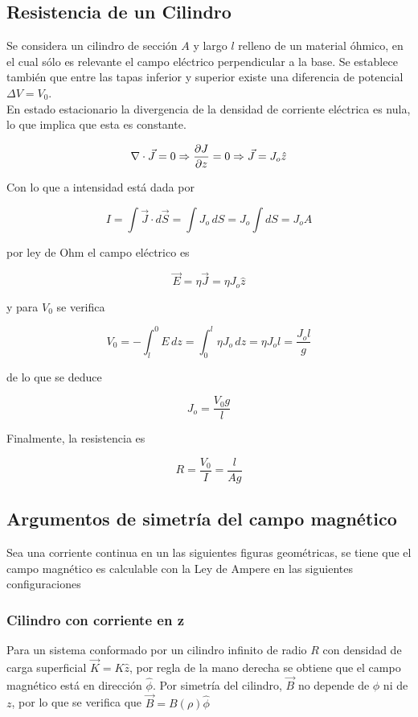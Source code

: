 \subsection{Resistencia de un Cilindro}
\label{ru:resist_cilindro}

Se considera un cilindro de sección $A$ y largo $l$ relleno de un material óhmico, en el cual sólo es relevante el campo eléctrico perpendicular a la base. Se establece también que entre las tapas inferior y superior existe una diferencia de potencial $\Delta V = V_0$.\\

En estado estacionario la divergencia de la densidad de corriente eléctrica es nula, lo que implica que esta es constante.

\[\nabla\cdot\Vec{J}=0\Rightarrow \frac{\partial J}{\partial z}=0\Rightarrow\Vec{J}=J_o\hat{z}\]

Con lo que a intensidad está dada por

\[I = \int\Vec{J}\cdot d\Vec{S}=\int J_o\,dS=J_o\int dS=J_oA\]

por ley de Ohm el campo eléctrico es

\[\Vec{E} = \eta\Vec{J} = \eta J_o\hat{z}\]

y para $V_0$ se verifica

\[V_0 = -\int^0_lE\,dz=\int^l_0\eta J_o\,dz=\eta J_ol=\frac{J_ol}{g}\]

de lo que se deduce

\[J_o = \frac{V_0g}{l}\]

Finalmente, la resistencia es

\[R = \frac{V_0}{I} = \frac{l}{Ag}\]

\subsection{Argumentos de simetría del campo magnético}
Sea una corriente continua en un las siguientes figuras geométricas, se tiene que el campo magnético es calculable con la Ley de Ampere en las siguientes configuraciones

\subsubsection{Cilindro con corriente en z}
\label{BcilindroZ}
Para un sistema conformado por un cilindro infinito de radio $R$ con densidad de carga superficial $\Vec{K} = K\hat{z}$, por regla de la mano derecha se obtiene que el campo magnético está en dirección $\hat{\phi}$. Por simetría del cilindro, $\Vec{B}$ no depende de $\phi$ ni de $z$, por lo que se verifica que $\Vec{B} = B(\rho)\hat{\phi}$\\

